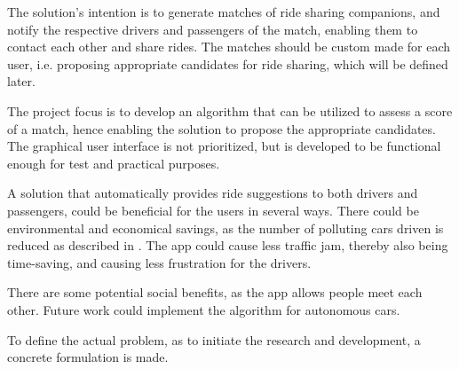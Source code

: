 The solution's intention is to generate matches of ride sharing companions, and notify the respective drivers and passengers of the match, enabling them to contact each other and share rides.
The matches should be custom made for each user, i.e. proposing appropriate candidates for ride sharing, which will be defined later.

The project focus is to develop an algorithm that can be utilized to assess a score of a match, hence enabling the solution to propose the appropriate candidates. The graphical user interface is not prioritized, but is developed to be functional enough for test and practical purposes.

A solution that automatically provides ride suggestions to both drivers and passengers, could be beneficial for the users in several ways. There could be environmental and economical savings, as the number of polluting cars driven is reduced as described in \cite{doi:10.1080/01441647.2011.621557}. The app could cause less traffic jam, thereby also being time-saving, and causing less frustration for the drivers.

There are some potential social benefits, as the app allows people meet each other. Future work could implement the algorithm for autonomous cars.

\iffalse
Since employers usually are located in the same area, and commuters could live in the same area, there should be a possibility for the commuters  potentially share cars and thereby reduce traffic.
There are many apps that allow users to request and give rides\todo{define}, but they require active participation of the users to do so. 
\fi

To define the actual problem, as to initiate the research and development, a concrete formulation is made.